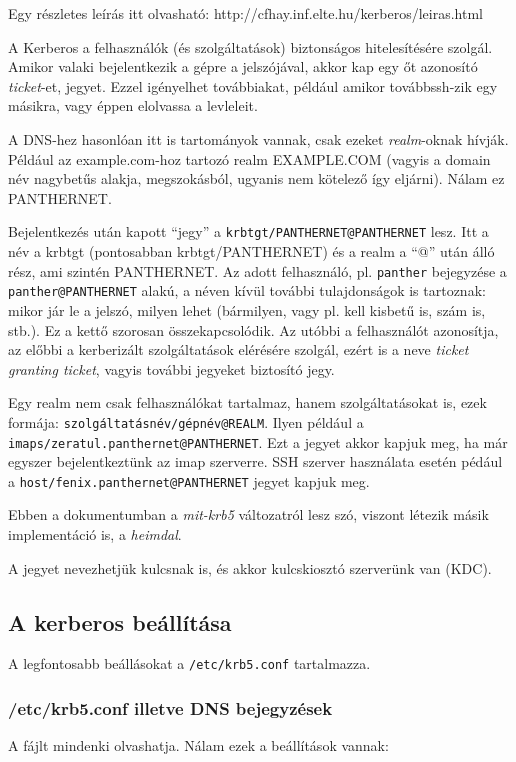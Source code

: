 \documentclass[fleqn,10pt,a4paper,titlepage]{article}
\begin{document}
  Egy részletes leírás itt olvasható: http://cfhay.inf.elte.hu/kerberos/leiras.html

  A Kerberos a felhasználók (és szolgáltatások) biztonságos hitelesítésére szolgál. Amikor valaki bejelentkezik a gépre
  a jelszójával, akkor kap egy őt azonosító \emph{ticket}-et, jegyet. Ezzel igényelhet továbbiakat, például amikor
  továbbssh-zik egy másikra, vagy éppen elolvassa a levleleit.
  
  A DNS-hez hasonlóan itt is tartományok vannak, csak ezeket \emph{realm}-oknak hívják. Például az example.com-hoz
  tartozó realm EXAMPLE.COM (vagyis a domain név nagybetűs alakja, megszokásból, ugyanis nem kötelező így
  eljárni). Nálam ez PANTHERNET.

  Bejelentkezés után kapott ``jegy'' a \texttt{krbtgt/PANTHERNET@PANTHERNET} lesz. Itt a név a krbtgt (pontosabban
  krbtgt/PANTHERNET) és a realm a ``@'' után álló rész, ami szintén PANTHERNET. Az adott felhasználó,
  pl. \texttt{panther} bejegyzése a \texttt{panther@PANTHERNET} alakú, a néven kívül további tulajdonságok is tartoznak:
  mikor jár le a jelszó, milyen lehet (bármilyen, vagy pl. kell kisbetű is, szám is, stb.). Ez a kettő szorosan
  összekapcsolódik. Az utóbbi a felhasználót azonosítja, az előbbi a kerberizált szolgáltatások elérésére szolgál, ezért
  is a neve \emph{ticket granting ticket}, vagyis további jegyeket biztosító jegy.
  
  Egy realm nem csak felhasználókat tartalmaz, hanem szolgáltatásokat is, ezek formája:
  \texttt{szolgáltatásnév/gépnév@REALM}. Ilyen például a \texttt{imaps/zeratul.panthernet@PANTHERNET}. Ezt a jegyet
  akkor kapjuk meg, ha már egyszer bejelentkeztünk az imap szerverre. SSH szerver használata esetén pédául a
  \texttt{host/fenix.panthernet@PANTHERNET} jegyet kapjuk meg.

  Ebben a dokumentumban a \emph{mit-krb5} változatról lesz szó, viszont létezik másik implementáció is, a \emph{heimdal}.

  A jegyet nevezhetjük kulcsnak is, és akkor kulcskiosztó szerverünk van (KDC).
  \subsection{A kerberos beállítása}
  A legfontosabb beállásokat a \texttt{/etc/krb5.conf} tartalmazza.
  
  \subsubsection{/etc/krb5.conf illetve DNS bejegyzések}
  A fájlt mindenki olvashatja. Nálam ezek a beállítások vannak:
\end{document}
